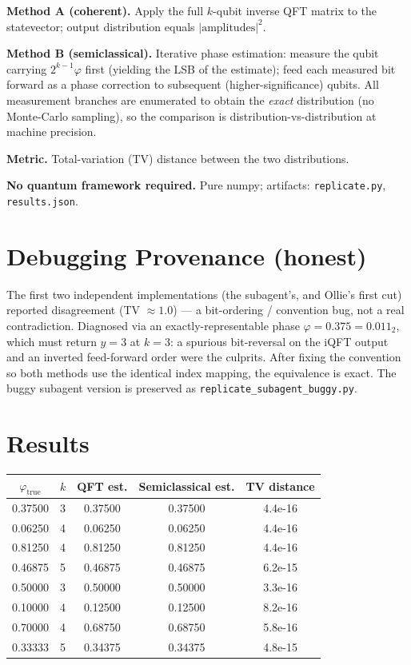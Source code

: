 \documentclass[11pt]{article}
\begin{document}
\textbf{Method A (coherent).} Apply the full $k$-qubit inverse QFT matrix
to the statevector; output distribution equals $|\text{amplitudes}|^2$.

\textbf{Method B (semiclassical).} Iterative phase estimation: measure the
qubit carrying $2^{k-1}\varphi$ first (yielding the LSB of the estimate);
feed each measured bit forward as a phase correction to subsequent
(higher-significance) qubits. All measurement branches are enumerated to
obtain the \emph{exact} distribution (no Monte-Carlo sampling), so the
comparison is distribution-vs-distribution at machine precision.

\textbf{Metric.} Total-variation (TV) distance between the two
distributions.

\textbf{No quantum framework required.} Pure numpy; artifacts: \texttt{replicate.py},
\texttt{results.json}.

\section{Debugging Provenance (honest)}
The first two independent implementations (the subagent's, and Ollie's
first cut) reported disagreement (TV $\approx 1.0$) --- a bit-ordering /
convention bug, not a real contradiction. Diagnosed via an
exactly-representable phase $\varphi = 0.375 = 0.011_2$, which must return
$y=3$ at $k=3$: a spurious bit-reversal on the iQFT output and an inverted
feed-forward order were the culprits. After fixing the convention so both
methods use the identical index mapping, the equivalence is exact. The
buggy subagent version is preserved as \texttt{replicate\_subagent\_buggy.py}.

\section{Results}
\begin{center}
\begin{tabular}{ccccc}
\toprule
$\varphi_{\text{true}}$ & $k$ & QFT est. & Semiclassical est. & TV distance \\
\midrule
0.37500 & 3 & 0.37500 & 0.37500 & 4.4e-16 \\
0.06250 & 4 & 0.06250 & 0.06250 & 4.4e-16 \\
0.81250 & 4 & 0.81250 & 0.81250 & 4.4e-16 \\
0.46875 & 5 & 0.46875 & 0.46875 & 6.2e-15 \\
0.50000 & 3 & 0.50000 & 0.50000 & 3.3e-16 \\
0.10000 & 4 & 0.12500 & 0.12500 & 8.2e-16 \\
0.70000 & 4 & 0.68750 & 0.68750 & 5.8e-16 \\
0.33333 & 5 & 0.34375 & 0.34375 & 4.8e-15 \\
\bottomrule
\end{tabular}
\end{center}
\end{document}

